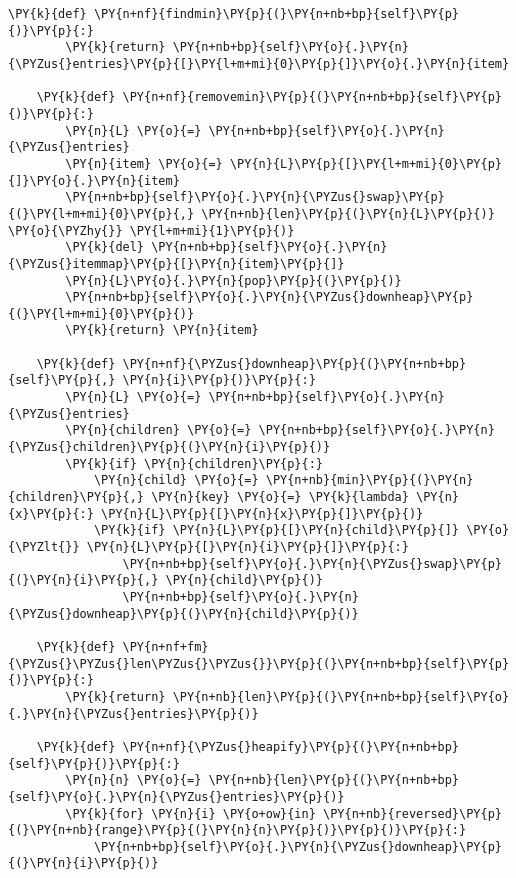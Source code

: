 \begin{Verbatim}[commandchars=\\\{\}]
    \PY{k}{def} \PY{n+nf}{findmin}\PY{p}{(}\PY{n+nb+bp}{self}\PY{p}{)}\PY{p}{:}
        \PY{k}{return} \PY{n+nb+bp}{self}\PY{o}{.}\PY{n}{\PYZus{}entries}\PY{p}{[}\PY{l+m+mi}{0}\PY{p}{]}\PY{o}{.}\PY{n}{item}

    \PY{k}{def} \PY{n+nf}{removemin}\PY{p}{(}\PY{n+nb+bp}{self}\PY{p}{)}\PY{p}{:}
        \PY{n}{L} \PY{o}{=} \PY{n+nb+bp}{self}\PY{o}{.}\PY{n}{\PYZus{}entries}
        \PY{n}{item} \PY{o}{=} \PY{n}{L}\PY{p}{[}\PY{l+m+mi}{0}\PY{p}{]}\PY{o}{.}\PY{n}{item}
        \PY{n+nb+bp}{self}\PY{o}{.}\PY{n}{\PYZus{}swap}\PY{p}{(}\PY{l+m+mi}{0}\PY{p}{,} \PY{n+nb}{len}\PY{p}{(}\PY{n}{L}\PY{p}{)} \PY{o}{\PYZhy{}} \PY{l+m+mi}{1}\PY{p}{)}
        \PY{k}{del} \PY{n+nb+bp}{self}\PY{o}{.}\PY{n}{\PYZus{}itemmap}\PY{p}{[}\PY{n}{item}\PY{p}{]}
        \PY{n}{L}\PY{o}{.}\PY{n}{pop}\PY{p}{(}\PY{p}{)}
        \PY{n+nb+bp}{self}\PY{o}{.}\PY{n}{\PYZus{}downheap}\PY{p}{(}\PY{l+m+mi}{0}\PY{p}{)}
        \PY{k}{return} \PY{n}{item}

    \PY{k}{def} \PY{n+nf}{\PYZus{}downheap}\PY{p}{(}\PY{n+nb+bp}{self}\PY{p}{,} \PY{n}{i}\PY{p}{)}\PY{p}{:}
        \PY{n}{L} \PY{o}{=} \PY{n+nb+bp}{self}\PY{o}{.}\PY{n}{\PYZus{}entries}
        \PY{n}{children} \PY{o}{=} \PY{n+nb+bp}{self}\PY{o}{.}\PY{n}{\PYZus{}children}\PY{p}{(}\PY{n}{i}\PY{p}{)}
        \PY{k}{if} \PY{n}{children}\PY{p}{:}
            \PY{n}{child} \PY{o}{=} \PY{n+nb}{min}\PY{p}{(}\PY{n}{children}\PY{p}{,} \PY{n}{key} \PY{o}{=} \PY{k}{lambda} \PY{n}{x}\PY{p}{:} \PY{n}{L}\PY{p}{[}\PY{n}{x}\PY{p}{]}\PY{p}{)}
            \PY{k}{if} \PY{n}{L}\PY{p}{[}\PY{n}{child}\PY{p}{]} \PY{o}{\PYZlt{}} \PY{n}{L}\PY{p}{[}\PY{n}{i}\PY{p}{]}\PY{p}{:}
                \PY{n+nb+bp}{self}\PY{o}{.}\PY{n}{\PYZus{}swap}\PY{p}{(}\PY{n}{i}\PY{p}{,} \PY{n}{child}\PY{p}{)}
                \PY{n+nb+bp}{self}\PY{o}{.}\PY{n}{\PYZus{}downheap}\PY{p}{(}\PY{n}{child}\PY{p}{)}

    \PY{k}{def} \PY{n+nf+fm}{\PYZus{}\PYZus{}len\PYZus{}\PYZus{}}\PY{p}{(}\PY{n+nb+bp}{self}\PY{p}{)}\PY{p}{:}
        \PY{k}{return} \PY{n+nb}{len}\PY{p}{(}\PY{n+nb+bp}{self}\PY{o}{.}\PY{n}{\PYZus{}entries}\PY{p}{)}

    \PY{k}{def} \PY{n+nf}{\PYZus{}heapify}\PY{p}{(}\PY{n+nb+bp}{self}\PY{p}{)}\PY{p}{:}
        \PY{n}{n} \PY{o}{=} \PY{n+nb}{len}\PY{p}{(}\PY{n+nb+bp}{self}\PY{o}{.}\PY{n}{\PYZus{}entries}\PY{p}{)}
        \PY{k}{for} \PY{n}{i} \PY{o+ow}{in} \PY{n+nb}{reversed}\PY{p}{(}\PY{n+nb}{range}\PY{p}{(}\PY{n}{n}\PY{p}{)}\PY{p}{)}\PY{p}{:}
            \PY{n+nb+bp}{self}\PY{o}{.}\PY{n}{\PYZus{}downheap}\PY{p}{(}\PY{n}{i}\PY{p}{)}
\end{Verbatim}



